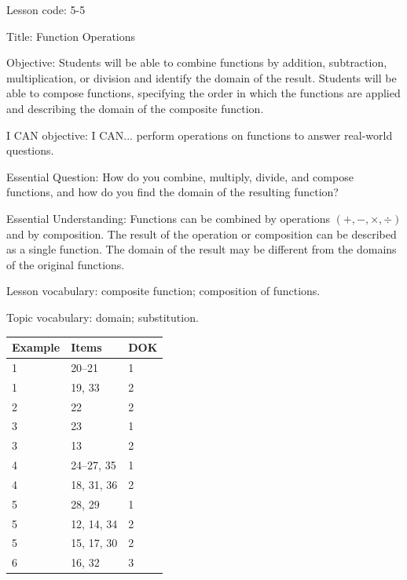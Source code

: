 \documentclass{article}
\newenvironment{lesson-meta}{}{}        %
\newenvironment{item-analysis}{}{}      %
\begin{document}
\begin{lesson-meta}
Lesson code: 5-5

Title: Function Operations

Objective: Students will be able to combine functions by addition, subtraction, multiplication, or division and identify the domain of the result. Students will be able to compose functions, specifying the order in which the functions are applied and describing the domain of the composite function.

I CAN objective: I CAN... perform operations on functions to answer real-world questions.

Essential Question: How do you combine, multiply, divide, and compose functions, and how do you find the domain of the resulting function?

Essential Understanding: Functions can be combined by operations \((+, -, \times, \div)\) and by composition. The result of the operation or composition can be described as a single function. The domain of the result may be different from the domains of the original functions.

Lesson vocabulary: composite function; composition of functions.

Topic vocabulary: domain; substitution.
\end{lesson-meta}

\begin{item-analysis}
\begin{tabular}{lll}
\toprule
Example & Items & DOK \\
\midrule
1 & 20--21 & 1 \\
1 & 19, 33 & 2 \\
2 & 22 & 2 \\
3 & 23 & 1 \\
3 & 13 & 2 \\
4 & 24--27, 35 & 1 \\
4 & 18, 31, 36 & 2 \\
5 & 28, 29 & 1 \\
5 & 12, 14, 34 & 2 \\
5 & 15, 17, 30 & 2 \\
6 & 16, 32 & 3 \\
\bottomrule
\end{tabular}
\end{item-analysis}
\end{document}
